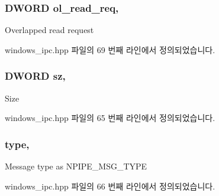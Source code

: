 \subsubsection[{\texorpdfstring{ol\+\_\+read\+\_\+req}{ol_read_req}}]{\setlength{\rightskip}{0pt plus 5cm}D\+W\+O\+RD ol\+\_\+read\+\_\+req\hspace{0.3cm}{\ttfamily [protected]}, {\ttfamily [inherited]}}\hypertarget{class_windows_n_pipe_message_a00febefc15f04548b030593221502d72}{}\label{class_windows_n_pipe_message_a00febefc15f04548b030593221502d72}
Overlapped read request 

windows\+\_\+ipc.\+hpp 파일의 69 번째 라인에서 정의되었습니다.

\subsubsection[{\texorpdfstring{sz}{sz}}]{\setlength{\rightskip}{0pt plus 5cm}D\+W\+O\+RD sz\hspace{0.3cm}{\ttfamily [protected]}, {\ttfamily [inherited]}}\hypertarget{class_windows_n_pipe_message_a09171c54248e2b5629cb28432fc246f7}{}\label{class_windows_n_pipe_message_a09171c54248e2b5629cb28432fc246f7}
Size 

windows\+\_\+ipc.\+hpp 파일의 65 번째 라인에서 정의되었습니다.

\subsubsection[{\texorpdfstring{type}{type}}]{ type\hspace{0.3cm}{\ttfamily [protected]}, {\ttfamily [inherited]}}\hypertarget{class_windows_n_pipe_message_af23d76d201079e292145d5f0acda4940}{}\label{class_windows_n_pipe_message_af23d76d201079e292145d5f0acda4940}
Message type as N\+P\+I\+P\+E\+\_\+\+M\+S\+G\+\_\+\+T\+Y\+PE 

windows\+\_\+ipc.\+hpp 파일의 66 번째 라인에서 정의되었습니다.


